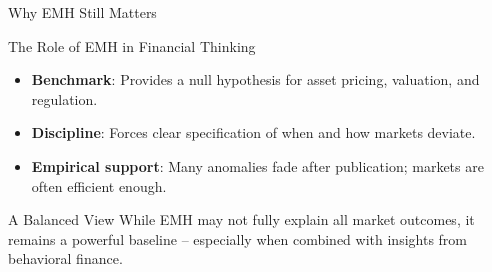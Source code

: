 \begin{frame}{Why EMH Still Matters}
	
	\begin{block}{The Role of EMH in Financial Thinking}
		\begin{itemize}
			\item \textbf{Benchmark}: Provides a null hypothesis for asset pricing, valuation, and regulation.
			\item \textbf{Discipline}: Forces clear specification of when and how markets deviate.
			\item \textbf{Empirical support}: Many anomalies fade after publication; markets are often efficient enough.
		\end{itemize}
	\end{block}
	
	\vspace{0.4cm}
	\begin{alertblock}{A Balanced View}
		While EMH may not fully explain all market outcomes, it remains a powerful baseline -- especially when combined with insights from behavioral finance.
	\end{alertblock}
	
\end{frame}


